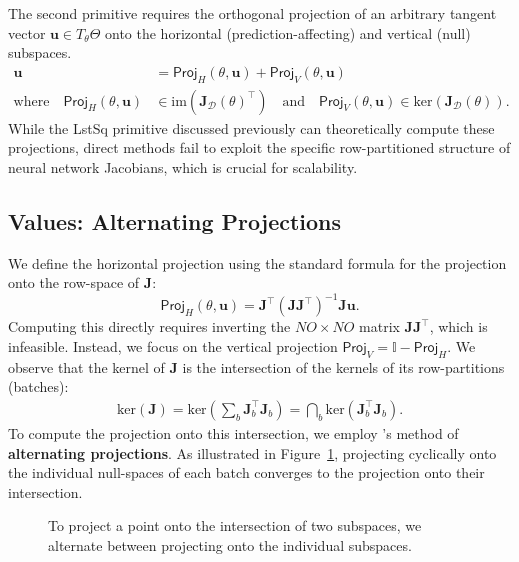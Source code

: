 The second primitive requires the orthogonal projection of an arbitrary tangent vector $\mathbf{u} \in T_\theta \Theta$ onto the horizontal (prediction-affecting) and vertical (null) subspaces.
\begin{align}
    \mathbf{u} &= \textsf{Proj}_H(\theta, \mathbf{u}) + \textsf{Proj}_V(\theta, \mathbf{u}) \\
    \text{where} \quad \textsf{Proj}_H(\theta, \mathbf{u}) &\in \text{im}(\mathbf{J}_\mathcal{D}(\theta)^\top) \quad \text{and} \quad \textsf{Proj}_V(\theta, \mathbf{u}) \in \text{ker}(\mathbf{J}_\mathcal{D}(\theta)).
\end{align}
While the \textsf{LstSq} primitive discussed previously can theoretically compute these projections, direct methods fail to exploit the specific row-partitioned structure of neural network Jacobians, which is crucial for scalability.

\subsection{Values: Alternating Projections}
We define the horizontal projection using the standard formula for the projection onto the row-space of $\mathbf{J}$:
\begin{equation}
    \label{eq:projection_basic_expression}
    \textsf{Proj}_H(\theta, \mathbf{u}) = \mathbf{J}^\top (\mathbf{J}\mathbf{J}^\top)^{-1} \mathbf{J} \mathbf{u}.
\end{equation}
Computing this directly requires inverting the $NO \times NO$ matrix $\mathbf{J}\mathbf{J}^\top$, which is infeasible. Instead, we focus on the vertical projection $\textsf{Proj}_V = \mathbb{I} - \textsf{Proj}_H$. We observe that the kernel of $\mathbf{J}$ is the intersection of the kernels of its row-partitions (batches):
\begin{align}
\label{eq: sum_ker}
  \text{ker}(\mathbf{J}) = \text{ker}\left(\sum_b \mathbf{J}_b^\top \mathbf{J}_b\right) = \bigcap_b \text{ker}(\mathbf{J}_b^\top \mathbf{J}_b).
\end{align}
To compute the projection onto this intersection, we employ \citeauthor{Neumann1949OnRO}'s method of \textbf{alternating projections}. As illustrated in Figure~\ref{fig:altproj}, projecting cyclically onto the individual null-spaces of each batch converges to the projection onto their intersection.


\begin{figure}[h]
    \centering
    \caption{To project a point onto the intersection of two subspaces, we alternate between projecting onto the individual subspaces.}
    \label{fig:altproj}
\end{figure}

